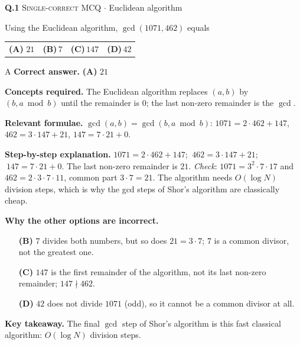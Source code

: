 \documentclass[11pt,a4paper]{article}
\newcommand{\optlabel}[1]{\textbf{(#1)}}
\newcommand{\correctlabel}[1]{\textcolor{okgreen}{\textbf{(#1)}\,\ding{51}}}
\newenvironment{qitem}[1]{\begin{list}{}{\setlength{\leftmargin}{3.3em}\setlength{\labelwidth}{3.1em}%
  \setlength{\labelsep}{0.2em}\setlength{\topsep}{3pt}\setlength{\parsep}{3pt}}\item[\textbf{Q.#1}\hfill]}{\end{list}}
\newcommand{\qsep}{\par\vspace{2pt}{\color{black!15}\hrule}\vspace{4pt}}
\newcommand{\qmeta}[2]{{\footnotesize\color{black!60}\textsc{#1} \;$\cdot$\; #2}\par}
\begin{document}
\begin{qitem}{1}
\qmeta{Single-correct MCQ}{Euclidean algorithm}
Using the Euclidean algorithm, $\gcd(1071, 462)$ equals
\par\smallskip\noindent\begin{tabularx}{\linewidth}{@{}*{4}{L}@{}}
\correctlabel{A}\,$21$ & \optlabel{B}\,$7$ & \optlabel{C}\,$147$ & \optlabel{D}\,$42$
\end{tabularx}
\end{qitem}
\begin{solbox}{A}
\textbf{\color{brand}Correct answer.} \textcolor{okgreen}{\textbf{(A)}} $21$

\textbf{\color{brand}Concepts required.} The Euclidean algorithm replaces $(a, b)$ by $(b, a \bmod b)$ until the remainder is $0$; the last non-zero remainder is the $\gcd$.

\textbf{\color{brand}Relevant formulae.} $\gcd(a, b) = \gcd(b, a \bmod b)$: $1071 = 2\cdot462 + 147$, $462 = 3\cdot147 + 21$, $147 = 7\cdot21 + 0$.

\textbf{\color{brand}Step-by-step explanation.} $1071 = 2\cdot462 + 147$; $\ 462 = 3\cdot147 + 21$; $\ 147 = 7\cdot21 + 0$. The last non-zero remainder is $21$.
\emph{Check}: $1071 = 3^2\cdot7\cdot17$ and $462 = 2\cdot3\cdot7\cdot11$, common part $3\cdot7 = 21$. The algorithm needs $O(\log N)$ division steps,
which is why the gcd steps of Shor's algorithm are classically cheap.

\textbf{\color{brand}Why the other options are incorrect.}
\begin{itemize}[leftmargin=2.4em, itemsep=1pt, topsep=2pt]
\item[\textbf{(B)}] $7$ divides both numbers, but so does $21 = 3\cdot7$; $7$ is a common divisor, not the greatest one.
\item[\textbf{(C)}] $147$ is the first remainder of the algorithm, not its last non-zero remainder; $147 \nmid 462$.
\item[\textbf{(D)}] $42$ does not divide $1071$ (odd), so it cannot be a common divisor at all.
\end{itemize}
\textbf{\color{brand}Key takeaway.} The final $\gcd$ step of Shor's algorithm is this fast classical algorithm: $O(\log N)$ division steps.
\end{solbox}
\qsep
\end{document}
